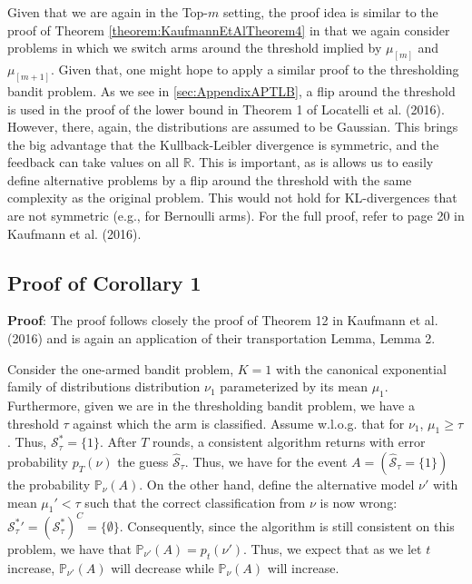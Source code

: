 \documentclass[11pt,]{article}
\begin{document}
Given that we are again in the Top-\(m\) setting, the proof idea is
similar to the proof of Theorem \ref{theorem:KaufmannEtAlTheorem4} in
that we again consider problems in which we switch arms around the
threshold implied by \(\mu_{[m]}\) and \(\mu_{[m+1]}\). Given that, one
might hope to apply a similar proof to the thresholding bandit problem.
As we see in \autoref{sec:AppendixAPTLB}, a flip around the threshold is
used in the proof of the lower bound in Theorem 1 of Locatelli et al.
(2016). However, there, again, the distributions are assumed to be
Gaussian. This brings the big advantage that the Kullback-Leibler
divergence is symmetric, and the feedback can take values on all
\(\mathbb{R}\). This is important, as is allows us to easily define
alternative problems by a flip around the threshold with the same
complexity as the original problem. This would not hold for
KL-divergences that are not symmetric (e.g., for Bernoulli arms). For
the full proof, refer to page 20 in Kaufmann et al. (2016).

\subsection{Proof of Corollary 1}\label{proof-of-corollary-1}

\textbf{Proof}: The proof follows closely the proof of Theorem 12 in
Kaufmann et al. (2016) and is again an application of their
transportation Lemma, Lemma 2.

Consider the one-armed bandit problem, \(K = 1\) with the canonical
exponential family of distributions distribution \(\nu_1\) parameterized
by its mean \(\mu_1\). Furthermore, given we are in the thresholding
bandit problem, we have a threshold \(\tau\) against which the arm is
classified. Assume w.l.o.g. that for \(\nu_1\), \(\mu_1 \geq \tau\).
Thus, \(\mathcal{S}_{\tau}^* = \{1\}\). After \(T\) rounds, a consistent
algorithm returns with error probability \(p_T(\nu)\) the guess
\(\hat{\mathcal{S}}_{\tau}\). Thus, we have for the event
\(A = (\hat{\mathcal{S}}_\tau = \{1\})\) the probability
\(\mathbb{P}_{\nu}(A)\). On the other hand, define the alternative model
\(\nu'\) with mean \(\mu_1' < \tau\) such that the correct
classification from \(\nu\) is now wrong:
\(\mathcal{S}_{\tau}^* {'} = (\mathcal{S}_{\tau}^*)^C = \{\emptyset\}\).
Consequently, since the algorithm is still consistent on this problem,
we have that \(\mathbb{P}_{\nu'}(A) = p_t(\nu')\). Thus, we expect that
as we let \(t\) increase, \(\mathbb{P}_{\nu'}(A)\) will decrease while
\(\mathbb{P}_{\nu}(A)\) will increase.
\end{document}
